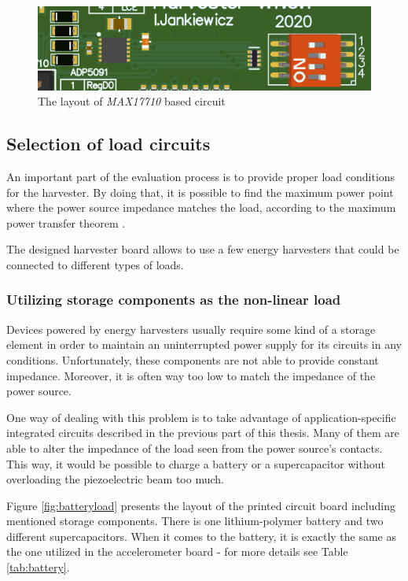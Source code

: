 \documentclass[12pt,a4paper]{article}
\begin{document}
\begin{figure}[ht!]
\includegraphics[scale=1.0]{max17710_layout.png}
\caption{The layout of \textit{MAX17710} based circuit}
\label{fig:max17710layout}
\end{figure}
\par

\subsection{Selection of load circuits}
An important part of the evaluation process is to provide proper load conditions for the harvester. By doing that, it is possible to find the maximum power point where the power source impedance matches the load, according to the maximum power transfer theorem \cite{mppt}.
\par
The designed harvester board allows to use a few energy harvesters that could be connected to different types of loads. 

\subsubsection{Utilizing storage components as the non-linear load}
Devices powered by energy harvesters usually require some kind of a storage element in order to maintain an uninterrupted power supply for its circuits in any conditions. Unfortunately, these components are not able to provide constant impedance. Moreover, it is often way too low to match the impedance of the power source.
\par

One way of dealing with this problem is to take advantage of application-specific integrated circuits described in the previous part of this thesis. Many of them are able to alter the impedance of the load seen from the power source's contacts. This way, it would be possible to charge a battery or a supercapacitor without overloading the piezoelectric beam too much.\par
Figure \ref{fig:batteryload} presents the layout of the printed circuit board including mentioned storage components. There is one lithium-polymer battery and two different supercapacitors. When it comes to the battery, it is exactly the same as the one utilized in the accelerometer board - for more details see Table \ref{tab:battery}.
\end{document}
